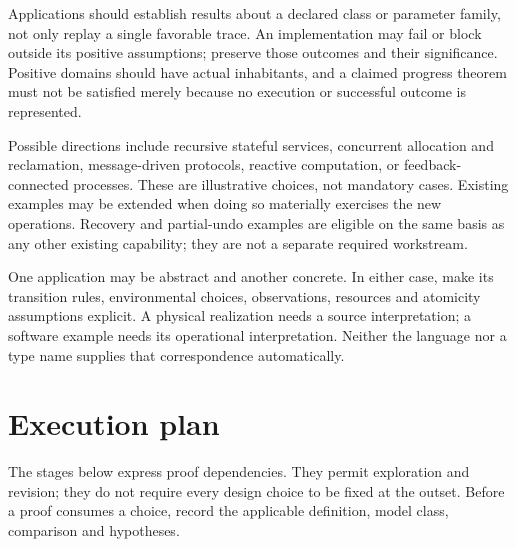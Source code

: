 \documentclass[11pt,a4paper]{article}
\begin{document}
Applications should establish results about a declared class or parameter family, not only replay a single favorable trace. An implementation may fail or block outside its positive assumptions; preserve those outcomes and their significance. Positive domains should have actual inhabitants, and a claimed progress theorem must not be satisfied merely because no execution or successful outcome is represented.

Possible directions include recursive stateful services, concurrent allocation and reclamation, message-driven protocols, reactive computation, or feedback-connected processes. These are illustrative choices, not mandatory cases. Existing examples may be extended when doing so materially exercises the new operations. Recovery and partial-undo examples are eligible on the same basis as any other existing capability; they are not a separate required workstream.

One application may be abstract and another concrete. In either case, make its transition rules, environmental choices, observations, resources and atomicity assumptions explicit. A physical realization needs a source interpretation; a software example needs its operational interpretation. Neither the language nor a type name supplies that correspondence automatically.

\section{Execution plan}\label{sec:plan}

The stages below express proof dependencies. They permit exploration and revision; they do not require every design choice to be fixed at the outset. Before a proof consumes a choice, record the applicable definition, model class, comparison and hypotheses.
\end{document}
